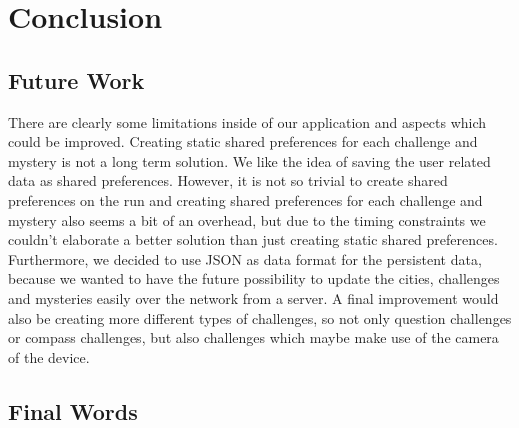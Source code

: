 \chapter{Conclusion}

\section{Future Work}

There are clearly some limitations inside of our application and aspects which could be improved. Creating static shared preferences for each challenge and mystery is not a long term solution. We like the idea of saving the user related data as shared preferences. However, it is not so trivial to create shared preferences on the run and creating shared preferences for each challenge and mystery also seems a bit of an overhead, but due to the timing constraints we couldn't elaborate a better solution than just creating static shared preferences. Furthermore, we decided to use JSON as data format for the persistent data, because we wanted to have the future possibility to update the cities, challenges and mysteries easily over the network from a server. A final improvement would also be creating more different types of challenges, so not only question challenges or compass challenges, but also challenges which maybe make use of the camera of the device.

\section{Final Words}

